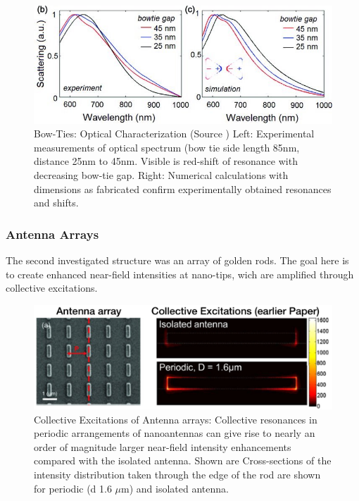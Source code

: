 \documentclass[journal, a4paper]{IEEEtran}
\begin{document}
\begin{figure}[hbt!]
\begin{center}
\includegraphics[width=\columnwidth]{10bowtie-resonance.jpg}
\caption{Bow-Ties: Optical Characterization (Source \cite{paper}) Left: Experimental measurements of optical spectrum (bow tie side length 85nm, distance 25nm to 45nm. Visible is red-shift of resonance with decreasing bow-tie gap. Right: Numerical calculations with dimensions as fabricated confirm experimentally obtained resonances and shifts.}
\label{fig:bowtie-resonance}
\end{center}
\end{figure}

\subsubsection{Antenna Arrays}
The second investigated structure was an array of golden rods. The goal here is to create enhanced near-field intensities at nano-tips, wich are amplified through collective excitations. 

\begin{figure}[hbt!]
\begin{center}
\includegraphics[width=\columnwidth]{11collective.png}
\caption{Collective Excitations \cite{collective-paper} of Antenna arrays: Collective resonances in periodic arrangements of nanoantennas can give rise to nearly an order of magnitude larger near-field intensity enhancements compared with the isolated antenna. Shown are Cross-sections of the intensity distribution taken through the edge of the rod are shown for periodic (d   1.6 $\mu$m) and isolated antenna.}
\label{fig:collective}
\end{center}
\end{figure}
\end{document}
